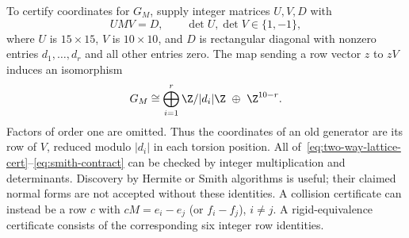 To certify coordinates for $G_M$, supply integer matrices $U,V,D$ with
\begin{equation}\label{eq:smith-contract}
 UMV=D,\qquad \det U,\det V\in\{1,-1\},
\end{equation}
where $U$ is $15\times15$, $V$ is $10\times10$, and $D$ is rectangular
diagonal with nonzero entries $d_1,\ldots,d_r$ and all other entries zero.
The map sending a row vector $z$ to $zV$ induces an isomorphism
\[
 G_M\cong\bigoplus_{i=1}^{r}\Z/|d_i|\Z\ \oplus\ \Z^{10-r}.
\]
Factors of order one are omitted. Thus the coordinates of an old generator
are its row of $V$, reduced modulo $|d_i|$ in each torsion position. All
of~\eqref{eq:two-way-lattice-cert}--\eqref{eq:smith-contract} can be
checked by integer multiplication and determinants. Discovery by Hermite
or Smith algorithms is useful; their claimed normal forms are not accepted
without these identities. A collision certificate can instead be a row
$c$ with $cM=e_i-e_j$ (or $f_i-f_j$), $i\ne j$. A rigid-equivalence
certificate consists of the corresponding six integer row identities.

